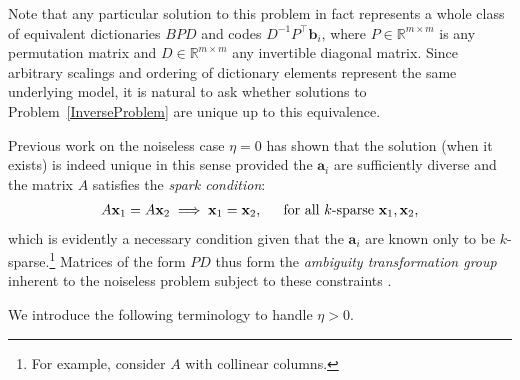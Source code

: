 \documentclass[journal, twocolumn]{IEEEtran}
\begin{document}
Note that any particular solution to this problem in fact represents a whole class of equivalent dictionaries $BPD$ and codes $D^{-1}P^{\top}\mathbf{b}_i$, where $P \in \mathbb{R}^{m \times m}$ is any permutation matrix and $D \in \mathbb{R}^{m \times m}$ any invertible diagonal matrix. Since  arbitrary scalings and ordering of dictionary elements represent the same underlying model, it is natural to ask whether solutions to Problem~\ref{InverseProblem} are unique up to this equivalence.

Previous work \cite{li2004analysis, Georgiev05, Aharon06, Hillar15} on the noiseless case $\eta = 0$ has shown that the solution (when it exists) is indeed unique in this sense provided the $\mathbf{a}_i$ are sufficiently diverse and the matrix $A$ satisfies the \textit{spark condition}:
\begin{align}\label{SparkCondition}
A\mathbf{x}_1 = A\mathbf{x}_2 \implies \mathbf{x}_1 = \mathbf{x}_2,\indent \text{for all $k$-sparse } \mathbf{x}_1, \mathbf{x}_2,
\end{align}
%
which is evidently a necessary condition given that the $\mathbf{a}_i$ are known only to be $k$-sparse.\footnote{For example, consider $A$ with collinear columns.} %
Matrices of the form $PD$ thus form the \emph{ambiguity transformation group} inherent to the noiseless problem subject to these constraints \cite{Li15}. 

We introduce the following terminology to handle $\eta > 0$.

\end{document}
